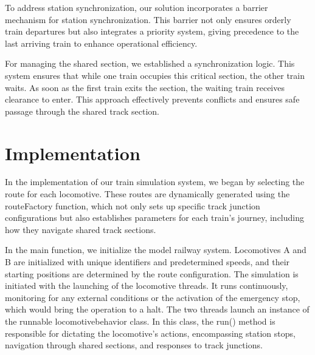 \documentclass{article}
\begin{document}
    To address station synchronization, our solution incorporates a barrier mechanism for station synchronization. This barrier not only ensures orderly train departures but also integrates a priority system, giving precedence to the last arriving train to enhance operational efficiency.

    For managing the shared section, we established a synchronization logic. This system ensures that while one train occupies this critical section, the other train waits. As soon as the first train exits the section, the waiting train receives clearance to enter. This approach effectively prevents conflicts and ensures safe passage through the shared track section.

    \pagebreak

    \section{Implementation}

    In the implementation of our train simulation system, we began by selecting the route for each locomotive. These routes are dynamically generated using the routeFactory function, which not only sets up specific track junction configurations but also establishes parameters for each train's journey, including how they navigate shared track sections.

    In the main function, we initialize the model railway system. Locomotives A and B are initialized with unique identifiers and predetermined speeds, and their starting positions are determined by the route configuration. The simulation is initiated with the launching of the locomotive threads. It runs continuously, monitoring for any external conditions or the activation of the emergency stop, which would bring the operation to a halt. The two threads launch an instance of the runnable locomotivebehavior class. In this class, the run() method is responsible for dictating the locomotive's actions, encompassing station stops, navigation through shared sections, and responses to track junctions.
\end{document}
